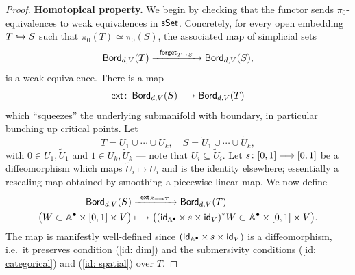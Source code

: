 \begin{proof}
    \textbf{Homotopical property.}
    We begin by checking that the functor sends $\pi_0$-equivalences to weak equivalences in $\operatorname{\sf sSet}$. Concretely, for every open embedding $T\hookrightarrow S$ such that $\pi_0(T) \simeq \pi_0(S)$, the associated map of simplicial sets 
    \begin{equation}
        \operatorname{\mathsf{Bord}}_{d,V}(T) \xrightarrow{\,\,\,\,\mathsf{forget}_{T \rightarrow S}\,\,\,\,} \operatorname{\mathsf{Bord}}_{d,V}(S),
    \end{equation}   
    is a weak equivalence. There is a map
    \[
    \mathsf{ext}\colon \operatorname{\mathsf{Bord}}_{d,V}(S) \longrightarrow \operatorname{\mathsf{Bord}}_{d,V}(T)
    \]
    which ``squeezes'' the underlying submanifold with boundary, in particular bunching up critical points. Let 
    \begin{equation}
        T = U_1 \cup \cdots \cup U_k, \quad S = \widetilde{U}_1 \cup \cdots \cup \widetilde{U}_k,
    \end{equation} 
    with $0\in U_1,\widetilde{U}_1$ and $1\in U_k,\widetilde{U}_k$ --- note that $U_i \subseteq \widetilde{U}_i$. Let $s\colon [0,1]\longrightarrow [0,1]$ be a diffeomorphism which maps $\widetilde{U}_i \mapsto U_i$ and is the identity elsewhere; essentially a rescaling map obtained by smoothing a piecewise-linear map. We now define
    \begin{align*}
        \operatorname{\mathsf{Bord}}_{d,V}(S) &\xrightarrow{\,\,\,\mathsf{ext}_{S \longrightarrow T}\,\,\,} \operatorname{\mathsf{Bord}}_{d,V}(T) \\
        \big( W \subset \mathbb A^\bullet \times [0,1]\times V \big) &\longmapsto \big((\operatorname{\sf id}_{\mathbb A^\bullet} \times\, s \times \operatorname{\sf id}_{V})^{*}W\subset \mathbb A^\bullet \times [0,1]\times V \big).
    \end{align*}
    The map is manifestly well-defined since $(\operatorname{\sf id}_{\mathbb A^\bullet} \times\, s \times \operatorname{\sf id}_{V})$ is a diffeomorphism, i.e.\ it preserves condition (\ref{id: dim}) and the submersivity conditions (\ref{id: categorical}) and (\ref{id: spatial}) over $T$. 


\end{proof}
